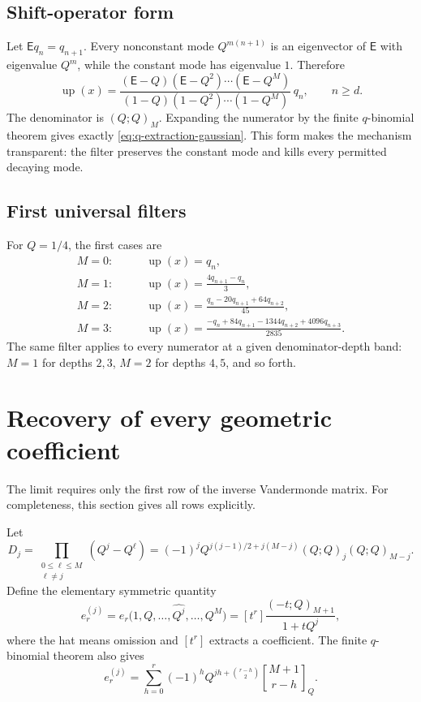 \documentclass[11pt]{article}
\newcommand{\upf}{\operatorname{up}}
\newcommand{\qbinom}[3]{\genfrac{[}{]}{0pt}{}{#1}{#2}_{#3}}
\newcommand{\Shift}{\mathsf{E}}
\begin{document}
\subsection{Shift-operator form}

Let \(\Shift q_n=q_{n+1}\).  Every nonconstant mode \(Q^{m(n+1)}\) is an
eigenvector of \(\Shift\) with eigenvalue \(Q^m\), while the constant mode has
eigenvalue \(1\).  Therefore
\begin{equation}\label{eq:shift-filter}
 \boxed{\displaystyle
 \upf(x)=
 \frac{(\Shift-Q)(\Shift-Q^2)\cdots(\Shift-Q^M)}
      {(1-Q)(1-Q^2)\cdots(1-Q^M)}\,q_n,
 \qquad n\ge d.}
\end{equation}
The denominator is \((Q;Q)_M\).  Expanding the numerator by the finite
\(q\)-binomial theorem gives exactly \cref{eq:q-extraction-gaussian}.
This form makes the mechanism transparent: the filter preserves the constant
mode and kills every permitted decaying mode.

\subsection{First universal filters}

For \(Q=1/4\), the first cases are
\begin{align}
 M=0:&\qquad \upf(x)=q_n,\label{eq:filter0}\\
 M=1:&\qquad \upf(x)=\frac{4q_{n+1}-q_n}{3},\label{eq:filter1}\\
 M=2:&\qquad \upf(x)=\frac{q_n-20q_{n+1}+64q_{n+2}}{45},\label{eq:filter2}\\
 M=3:&\qquad \upf(x)=
 \frac{-q_n+84q_{n+1}-1344q_{n+2}+4096q_{n+3}}{2835}.
 \label{eq:filter3}
\end{align}
The same filter applies to every numerator at a given denominator-depth band:
\(M=1\) for depths \(2,3\), \(M=2\) for depths \(4,5\), and so forth.

\section{Recovery of every geometric coefficient}

The limit requires only the first row of the inverse Vandermonde matrix.  For
completeness, this section gives all rows explicitly.

Let
\begin{equation}\label{eq:Dj}
 D_j=\prod_{\substack{0\le\ell\le M\\\ell\ne j}}(Q^j-Q^\ell)
 =(-1)^jQ^{j(j-1)/2+j(M-j)}(Q;Q)_j(Q;Q)_{M-j}.
\end{equation}
Define the elementary symmetric quantity
\begin{equation}\label{eq:erj}
 e_r^{(j)}
 =e_r\bigl(1,Q,\ldots,\widehat{Q^j},\ldots,Q^M\bigr)
 =[t^r]\frac{(-t;Q)_{M+1}}{1+tQ^j},
\end{equation}
where the hat means omission and \([t^r]\) extracts a coefficient.  The finite
\(q\)-binomial theorem also gives
\begin{equation}\label{eq:erj-qbinom}
 e_r^{(j)}=
 \sum_{h=0}^{r}(-1)^hQ^{jh+\binom{r-h}{2}}
 \qbinom{M+1}{r-h}{Q}.
\end{equation}
\end{document}
